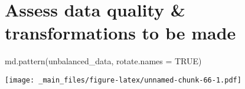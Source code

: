 \documentclass[
]{book}
\newenvironment{Shaded}{\begin{snugshade}}{\end{snugshade}}
\newcommand{\AttributeTok}[1]{\textcolor[rgb]{0.77,0.63,0.00}{#1}}
\newcommand{\ConstantTok}[1]{\textcolor[rgb]{0.00,0.00,0.00}{#1}}
\newcommand{\FunctionTok}[1]{\textcolor[rgb]{0.00,0.00,0.00}{#1}}
\newcommand{\NormalTok}[1]{#1}
\begin{document}
\hypertarget{assess-data-quality-transformations-to-be-made}{%
\section{Assess data quality \& transformations to be made}\label{assess-data-quality-transformations-to-be-made}}

\begin{Shaded}
\begin{Highlighting}[]
\FunctionTok{md.pattern}\NormalTok{(unbalanced\_data, }\AttributeTok{rotate.names =} \ConstantTok{TRUE}\NormalTok{)}
\end{Highlighting}
\end{Shaded}

\texttt{[image: \_main\_files/figure-latex/unnamed-chunk-66-1.pdf]}
\end{document}
